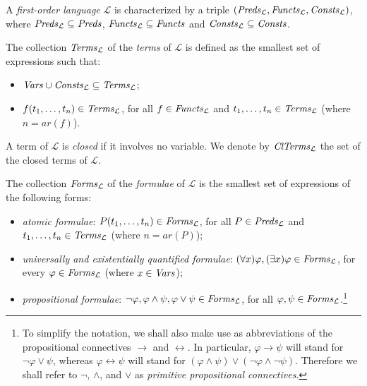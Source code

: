 \documentclass[a4paper]{llncs}
\newcommand{\Lang}{\ensuremath{\mathcal{L}\xspace}} %
\newcommand{\LangPreds}{\Preds_{\Lang}}
\newcommand{\LangFuncts}{\Functs_{\Lang}}
\newcommand{\LangConsts}{\Consts_{\Lang}}
\newcommand{\LangTerms}{\Terms_{\Lang}}
\newcommand{\LangClTerms}{\ClTerms_{\Lang}}
\newcommand{\LangForms}{\Forms_{\Lang}}
\newcommand{\ar}{\mathit{ar}}
\newcommand{\nat}{\mathbb{N}}
\begin{document}
A \emph{first-order language} $\Lang$ is characterized by
a triple $(\LangPreds, \LangFuncts, \LangConsts)$, where
$\LangPreds \subseteq \Preds$, $\LangFuncts \subseteq \Functs$ and
$\LangConsts \subseteq \Consts$.

The collection $\LangTerms$ of the \emph{terms} of $\Lang$ is
defined as the smallest set of expressions such that:
\begin{itemize}
\item $\Vars \cup \LangConsts \subseteq \LangTerms$;

\item $f(t_1, \ldots, t_n) \in \LangTerms$, for all $f \in 
\LangFuncts$ and $t_1, \ldots, t_n \in \LangTerms$ (where $n = \ar(f)$).
\end{itemize}
A term of $\Lang$ is \emph{closed} if it involves no variable. We 
denote by $\LangClTerms$ the set of the closed terms of $\Lang$.

The collection $\LangForms$ of the \emph{formulae} of
$\Lang$ is the smallest set of expressions of the following forms:
\begin{itemize}
  \item \emph{atomic formulae}: $P(t_1, \ldots, t_n) \in \LangForms$, 
for all $P \in \LangPreds$ and $t_1, \ldots, t_n \in \LangTerms$ 
(where $n = \ar(P)$);
%

  \item \emph{universally and existentially quantified formulae}:
  $(\forall x)\varphi, (\exists x)\varphi \in \LangForms$, for every 
$\varphi \in \LangForms$ (where $x \in \mathit{Vars}$);

  \item \emph{propositional formulae}: $\neg \varphi, \varphi \wedge 
\psi,   \varphi \vee \psi \in \LangForms$, for all $\varphi, \psi \in 
\LangForms$.\footnote{To simplify the notation, we shall also make 
use as abbreviations of the propositional connectives $\rightarrow$ 
and $\leftrightarrow$. In particular, $\varphi \rightarrow \psi$ will 
stand for $\neg \varphi \vee \psi$, whereas $\varphi \leftrightarrow 
\psi$ will stand for $(\varphi \wedge \psi) \vee (\neg \varphi \wedge 
\neg\psi)$. Therefore we shall refer to $\neg$, $\wedge$, and $\vee$ 
as \emph{primitive propositional connectives}.}
%
\end{itemize}
\end{document}
